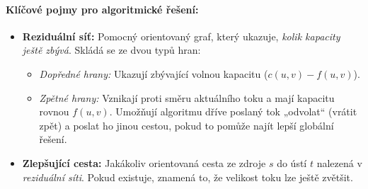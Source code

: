 \paragraph*{Klíčové pojmy pro algoritmické řešení:}
\begin{itemize}
    \item \textbf{Reziduální síť:} Pomocný orientovaný graf, který ukazuje, \textit{kolik kapacity ještě zbývá}. Skládá se ze dvou typů hran:
    \begin{itemize}
        \item \textit{Dopředné hrany:} Ukazují zbývající volnou kapacitu ($c(u, v) - f(u, v)$).
        \item \textit{Zpětné hrany:} Vznikají proti směru aktuálního toku a mají kapacitu rovnou $f(u, v)$. Umožňují algoritmu dříve poslaný tok „odvolat“ (vrátit zpět) a poslat ho jinou cestou, pokud to pomůže najít lepší globální řešení.
    \end{itemize}
    \item \textbf{Zlepšující cesta:} Jakákoliv orientovaná cesta ze zdroje $s$ do ústí $t$ nalezená v \textit{reziduální síti}. Pokud existuje, znamená to, že velikost toku lze ještě zvětšit.
\end{itemize}

